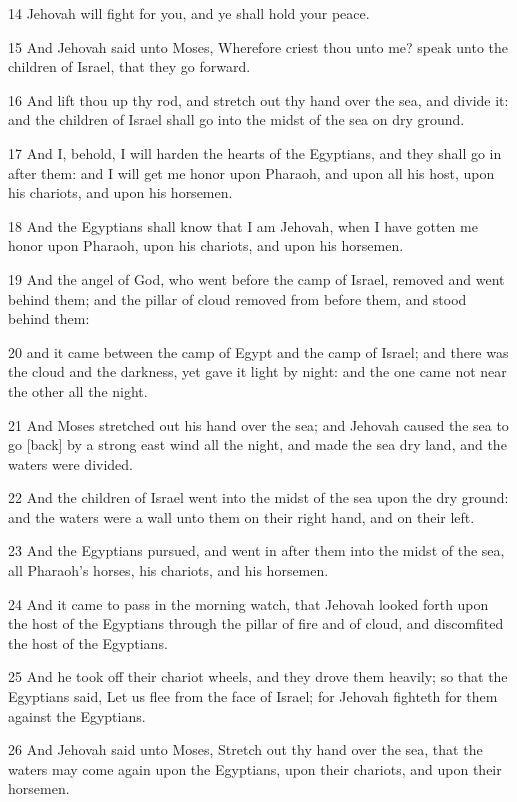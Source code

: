 \par 14 Jehovah will fight for you, and ye shall hold your peace.
\par 15 And Jehovah said unto Moses, Wherefore criest thou unto me? speak unto the children of Israel, that they go forward.
\par 16 And lift thou up thy rod, and stretch out thy hand over the sea, and divide it: and the children of Israel shall go into the midst of the sea on dry ground.
\par 17 And I, behold, I will harden the hearts of the Egyptians, and they shall go in after them: and I will get me honor upon Pharaoh, and upon all his host, upon his chariots, and upon his horsemen.
\par 18 And the Egyptians shall know that I am Jehovah, when I have gotten me honor upon Pharaoh, upon his chariots, and upon his horsemen.
\par 19 And the angel of God, who went before the camp of Israel, removed and went behind them; and the pillar of cloud removed from before them, and stood behind them:
\par 20 and it came between the camp of Egypt and the camp of Israel; and there was the cloud and the darkness, yet gave it light by night: and the one came not near the other all the night.
\par 21 And Moses stretched out his hand over the sea; and Jehovah caused the sea to go [back] by a strong east wind all the night, and made the sea dry land, and the waters were divided.
\par 22 And the children of Israel went into the midst of the sea upon the dry ground: and the waters were a wall unto them on their right hand, and on their left.
\par 23 And the Egyptians pursued, and went in after them into the midst of the sea, all Pharaoh's horses, his chariots, and his horsemen.
\par 24 And it came to pass in the morning watch, that Jehovah looked forth upon the host of the Egyptians through the pillar of fire and of cloud, and discomfited the host of the Egyptians.
\par 25 And he took off their chariot wheels, and they drove them heavily; so that the Egyptians said, Let us flee from the face of Israel; for Jehovah fighteth for them against the Egyptians.
\par 26 And Jehovah said unto Moses, Stretch out thy hand over the sea, that the waters may come again upon the Egyptians, upon their chariots, and upon their horsemen.
